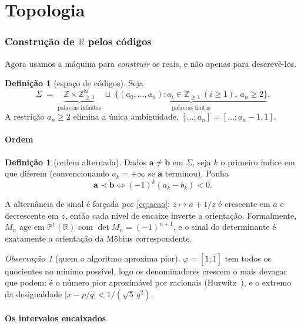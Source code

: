 \documentclass[11pt,a4paper]{article}
\theoremstyle{plain}
\theoremstyle{definition}
\newtheorem{definicao}[teorema]{Definição}
\theoremstyle{remark}
\newtheorem{obs}[teorema]{Observação}
\newcommand{\R}{\mathbb{R}}
\newcommand{\Z}{\mathbb{Z}}
\newcommand{\N}{\mathbb{N}}
\newcommand{\Pj}{\mathbb{P}^1}
\newcommand{\Sig}{\Sigma}
\newcommand{\cf}[2]{[#1;#2]}
\begin{document}
\part{Topologia}



\section{Construção de \texorpdfstring{$\R$}{R} pelos códigos}\label{sec:constr}

Agora usamos a máquina para \emph{construir} os reais, e não apenas para descrevê-los.

\begin{definicao}[espaço de códigos]
Seja
\[
  \Sig \;=\; \underbrace{\Z\times\Z_{\geq1}^{\N}}_{\text{palavras infinitas}}
  \;\sqcup\;
  \underbrace{\{(a_0,\dots,a_n): a_i\in\Z_{\geq1}\ (i\geq1),\ a_n\geq 2\}}_{\text{palavras finitas}} .
\]
A restrição $a_n \geq 2$ elimina a única ambiguidade, $\cf{\dots}{a_n}=\cf{\dots}{a_n-1,1}$.
\end{definicao}

\subsection{Ordem}\label{sec:ord}

\begin{definicao}[ordem alternada]\label{prop:ordem}
Dados $\mathbf a \neq \mathbf b$ em $\Sig$, seja $k$ o primeiro índice em que diferem
(convencionando $a_k = +\infty$ se $\mathbf a$ terminou). Ponha
\[
  \mathbf a \prec \mathbf b \iff (-1)^k (a_k - b_k) < 0 .
\]
\end{definicao}

A alternância de sinal é forçada por \eqref{eq:acao}: $z\mapsto a+1/z$ é crescente em $a$ e
decrescente em $z$, então cada nível de encaixe inverte a orientação. Formalmente, $M_n$ age em
$\Pj(\R)$ com $\det M_n = (-1)^{n+1}$, e o sinal do determinante é exatamente a orientação da
Möbius correspondente.

\begin{obs}[quem o algoritmo aproxima pior]\label{obs:hurwitz}
$\varphi = \cf{1}{\overline{1}}$ tem todos os quocientes no mínimo possível, logo os denominadores
crescem o mais devagar que podem: é o número pior aproximável por racionais (Hurwitz~\cite{hurwitz1891}),
e o extremo da desigualdade $|x-p/q| < 1/(\sqrt5\,q^2)$.
\end{obs}

\subsection{Os intervalos encaixados}
\end{document}

